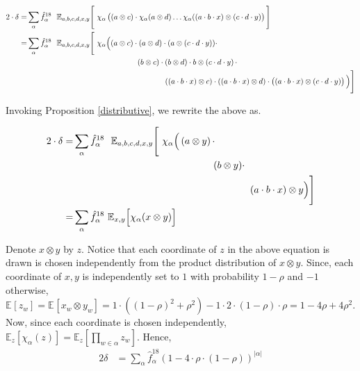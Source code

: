 \documentclass[11pt]{article}
\newcommand{\E}[2]{{\mathbb{E}}_{#1}\left[#2\right]}
\begin{document}
\begin{align*}
2 \cdot \delta = & \sum_\alpha \hat{f}^{18}_{\alpha}\ \  \mathbb{E}_{a,b,c,d,x,y}\Bigg[\ \chi_{\alpha}\left( \left(a \otimes c\right) \cdot  \chi_{\alpha}(a \otimes d) \ldots  \chi_{\alpha}((a \cdot b \cdot x) \otimes (c \cdot d \cdot y)\right) \Bigg] \\
= & \sum_\alpha \hat{f}^{18}_{\alpha}\ \  \mathbb{E}_{a,b,c,d,x,y}\Bigg[\ \chi_{\alpha}\Big( (a \otimes c)  \cdot \left(a \otimes d\right) \cdot (a \otimes (c \cdot d \cdot y)) \cdot \\ & \hspace{2in} (b \otimes c) \cdot (b \otimes d) \cdot b \otimes \left(c \cdot d \cdot y \right) \cdot \\ & \hspace*{2.5in} ((a \cdot b \cdot x) \otimes c) \cdot ((a \cdot b \cdot x) \otimes d) \cdot \left((a \cdot b \cdot x) \otimes (c \cdot d \cdot y)\right) \Big) \Bigg]
\end{align*}

\noindent Invoking Proposition \ref{distributive}, we rewrite the above as.

\begin{align*}
  2 \cdot \delta = & \sum_\alpha \hat{f}^{18}_{\alpha}\ \
  \mathbb{E}_{a,b,c,d,x,y}\Bigg[\ \chi_{\alpha}\Big( \left( a \otimes y \right) \cdot \\ & \hspace*{2in} (b \otimes y) \cdot \\ & \hspace*{2.5in} \left(a \cdot b \cdot x\right) \otimes y \Big) \Bigg]\\
 = & \sum_\alpha \hat{f}^{18}_\alpha \ \mathbb{E}_{x,y}\Big[\chi_\alpha(x \otimes y)\Big]
\end{align*}

\noindent Denote $x \otimes y$ by $z$. Notice that each coordinate of
$z$ in the above equation is drawn is chosen independently from the
product distribution of $x\otimes y$. Since, each coordinate of $x,y$
is independently set to $1$ with probability $1 - \rho$ and $-1$
otherwise, $\E{}{z_w} = \E{}{x_w \otimes y_w} = 1 \cdot ((1 - \rho)^2 +
\rho^2) - 1 \cdot 2 \cdot (1 -\rho) \cdot \rho = 1 - 4\rho + 4
\rho^2.$ Now, since each coordinate is chosen independently,
$\E{z}{\chi_\alpha(z)} = \E{z}{\prod_{w \in \alpha}z_w}$.  Hence,
\begin{align*}
  2 \delta &= \sum_{\alpha} \hat{f}_\alpha^{18} \left(1 - 4\cdot \rho\cdot \left(1 - \rho\right)\right)^{|\alpha|} \\
\end{align*}
\end{document}
